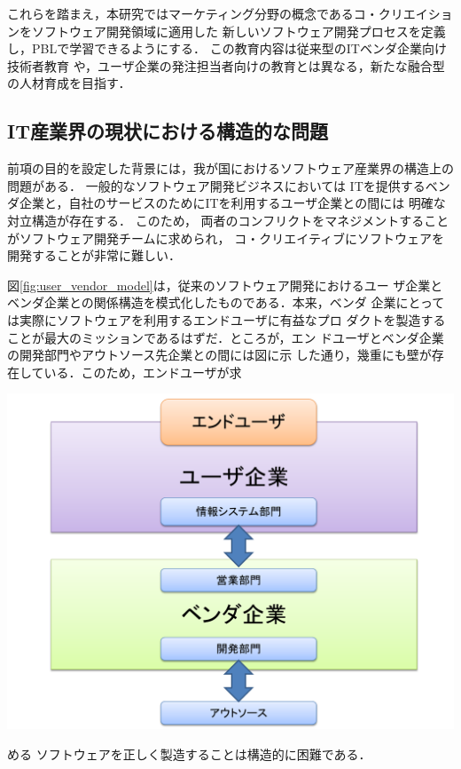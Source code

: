 \documentclass[a4j,twoside]{jarticle}
\begin{document}
\begin{multicols}{2}
    これらを踏まえ，本研究ではマーケティング分野の概念であるコ・クリエイションをソフトウェア開発領域に適用した
    新しいソフトウェア開発プロセスを定義し，PBLで学習できるようにする．
    この教育内容は従来型のITベンダ企業向け技術者教育
    や，ユーザ企業の発注担当者向けの教育とは異なる，新たな融合型の人材育成を目指す．
	
\subsection{IT産業界の現状における構造的な問題}
    前項の目的を設定した背景には，我が国におけるソフトウェア産業界の構造上の問題がある．
	一般的なソフトウェア開発ビジネスにおいては    
    ITを提供するベンダ企業と，自社のサービスのためにITを利用するユーザ企業との間には
    明確な対立構造が存在する．
    このため，
    両者のコンフリクトをマネジメントすることがソフトウェア開発チームに求められ，
    コ・クリエイティブにソフトウェアを開発することが非常に難しい．
    
    図\ref{fig:user_vendor_model}は，従来のソフトウェア開発におけるユー
    ザ企業とベンダ企業との関係構造を模式化したものである．本来，ベンダ
    企業にとっては実際にソフトウェアを利用するエンドユーザに有益なプロ
    ダクトを製造することが最大のミッションであるはずだ．ところが，エン
    ドユーザとベンダ企業の開発部門やアウトソース先企業との間には図に示
    した通り，幾重にも壁が存在している．このため，エンドユーザが求
\begin{center}
\includegraphics[width=0.8\linewidth]{figs/user_vendor_model.pdf}
\label{fig:user_vendor_model}
\end{center}
    める
    ソフトウェアを正しく製造することは構造的に困難である．
    

\end{multicols}
\end{document}
